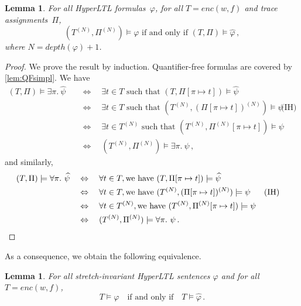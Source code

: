 \documentclass[dvipsnames,10pt,a4paper]{amsart}
\newtheorem{lem}[thm]{Lemma}
\theoremstyle{definition}
\theoremstyle{remark}
\newcommand{\hyltl}{{HyperLTL}\xspace}
\newcommand\enc[2]{\mathit{enc}(#1,#2)}
\newcommand\tn[2]{#1^{(#2)}}
\newcommand\nun[2]{#1^{(#2)}}
\newcommand\simpl[1]{\widehat {#1}}
\begin{document}
\begin{lem}\label{lem:Qsimpl}
  For all \hyltl formulas~$\varphi $,
  for all $T = \enc w f$ and trace assignments~$\Pi$,
  \[
 (\tn T N, \nun \Pi N) \models \varphi    \text{ if and only if }
    (T, \Pi) \models \simpl \varphi \, ,
  \]
  where $N = \mathit{depth}(\varphi)+1$.
\end{lem}
\begin{proof}
  We prove the result by induction. Quantifier-free formulas are covered by \autoref{lem:QFsimpl}. 
  We have
  \begin{align*}
    (T, \Pi) \models \exists \pi.\ \simpl \psi
    & \quad\Leftrightarrow\quad
      \exists t \in T \text{ such that }
      (T,\Pi[\pi \mapsto t]) \models \simpl \psi \\
    & \quad\Leftrightarrow\quad
      \exists t \in T \text{ such that }
      (\tn T N, \nun {(\Pi[\pi \mapsto t])} N)
      \models \psi && \text{(IH)} \\
    & \quad\Leftrightarrow\quad
        \exists t \in \tn T N \text{ such that }
      (\tn T N, \nun {\Pi} N[\pi \mapsto t])
      \models \psi \\
    & \quad\Leftrightarrow\quad
        (\tn T N, \nun \Pi N) \models \exists \pi.\ \psi \, ,
  \end{align*}
  and similarly,
  \begin{align*}
    (T, \Pi) \models \forall \pi.\ \simpl \psi
    & \quad\Leftrightarrow\quad
      \forall t \in T, \text{we have }
      (T,\Pi[\pi \mapsto t]) \models \simpl \psi \\
    & \quad\Leftrightarrow\quad
      \forall t \in T, \text{we have }
      (\tn T N, \nun {(\Pi[\pi \mapsto t])} N)
      \models \psi && \text{(IH)} \\
    & \quad\Leftrightarrow\quad
        \forall t \in \tn T N, \text{we have }
      (\tn T N, \nun \Pi N [\pi \mapsto t])
      \models \psi \\
    & \quad\Leftrightarrow\quad
        (\tn T N, \nun \Pi N) \models \forall \pi.\ \psi \, . && \qedhere
  \end{align*}
\end{proof}

As a consequence, we obtain the following equivalence.

\begin{lem}\label{lem:eqsimpl}
  For all stretch-invariant \hyltl sentences $\varphi$ and
  for all $T = \enc w f$,
  \[
    T \models \varphi \quad\text{if and only if}\quad
    T \models \simpl \varphi \, .
  \]
\end{lem}
\end{document}
